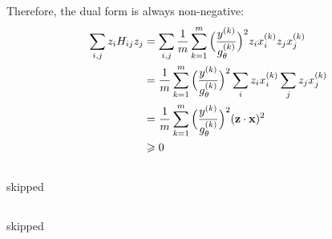 \documentclass[main]{subfiles}
\begin{document}
Therefore, the dual form is always non-negative:
\begin{align*}
	\sum\limits_{i,j} z_i H_{ij} z_j
		&=
			\sum\limits_{i,j}
			\frac{1}{m} \sum\limits_{k=1}^{m}
			\Big(\frac{y^{(k)}}{g_{\mathbf{\theta}}^{(k)}}\Big)^2
			 z_i x^{(k)}_i z_j x^{(k)}_j		\\
		&=
			\frac{1}{m} \sum\limits_{k=1}^{m}
			\Big(\frac{y^{(k)}}{g_{\mathbf{\theta}}^{(k)}}\Big)^2
			\sum\limits_{i}
			z_i x^{(k)}_i
			\sum\limits_{j}
			z_j x^{(k)}_j						\\
		&=
			\frac{1}{m} \sum\limits_{k=1}^{m}
			\Big(\frac{y^{(k)}}{g_{\mathbf{\theta}}^{(k)}}\Big)^2
			(\mathbf{z}\cdot\mathbf{x})^2					\\
		&\geqslant 0
\end{align*}

\subsection{}
skipped

\subsection{}
skipped

\end{document}
